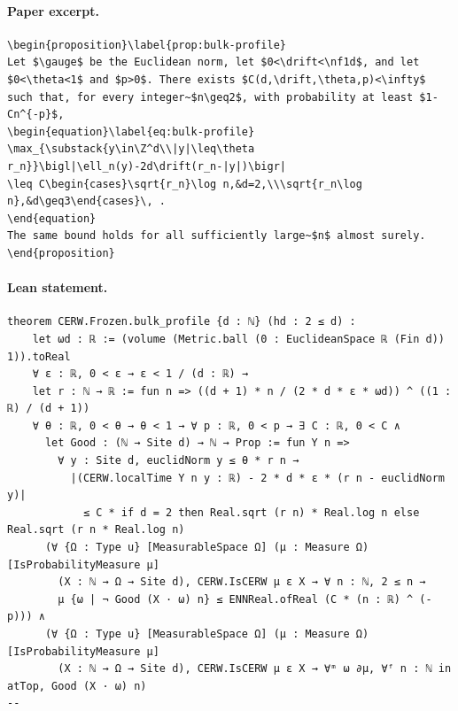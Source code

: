 \paragraph{Paper excerpt.}
\begin{verbatim}
\begin{proposition}\label{prop:bulk-profile}
Let $\gauge$ be the Euclidean norm, let $0<\drift<\nf1d$, and let $0<\theta<1$ and $p>0$. There exists $C(d,\drift,\theta,p)<\infty$ such that, for every integer~$n\geq2$, with probability at least $1-Cn^{-p}$,
\begin{equation}\label{eq:bulk-profile}
\max_{\substack{y\in\Z^d\\|y|\leq\theta r_n}}\bigl|\ell_n(y)-2d\drift(r_n-|y|)\bigr|
\leq C\begin{cases}\sqrt{r_n}\log n,&d=2,\\\sqrt{r_n\log n},&d\geq3\end{cases}\, .
\end{equation}
The same bound holds for all sufficiently large~$n$ almost surely.
\end{proposition}
\end{verbatim}
\paragraph{Lean statement.}
\begin{verbatim}
theorem CERW.Frozen.bulk_profile {d : ℕ} (hd : 2 ≤ d) :
    let ωd : ℝ := (volume (Metric.ball (0 : EuclideanSpace ℝ (Fin d)) 1)).toReal
    ∀ ε : ℝ, 0 < ε → ε < 1 / (d : ℝ) →
    let r : ℕ → ℝ := fun n => ((d + 1) * n / (2 * d * ε * ωd)) ^ ((1 : ℝ) / (d + 1))
    ∀ θ : ℝ, 0 < θ → θ < 1 → ∀ p : ℝ, 0 < p → ∃ C : ℝ, 0 < C ∧
      let Good : (ℕ → Site d) → ℕ → Prop := fun Y n =>
        ∀ y : Site d, euclidNorm y ≤ θ * r n →
          |(CERW.localTime Y n y : ℝ) - 2 * d * ε * (r n - euclidNorm y)|
            ≤ C * if d = 2 then Real.sqrt (r n) * Real.log n else Real.sqrt (r n * Real.log n)
      (∀ {Ω : Type u} [MeasurableSpace Ω] (μ : Measure Ω) [IsProbabilityMeasure μ]
        (X : ℕ → Ω → Site d), CERW.IsCERW μ ε X → ∀ n : ℕ, 2 ≤ n →
        μ {ω | ¬ Good (X · ω) n} ≤ ENNReal.ofReal (C * (n : ℝ) ^ (-p))) ∧
      (∀ {Ω : Type u} [MeasurableSpace Ω] (μ : Measure Ω) [IsProbabilityMeasure μ]
        (X : ℕ → Ω → Site d), CERW.IsCERW μ ε X → ∀ᵐ ω ∂μ, ∀ᶠ n : ℕ in atTop, Good (X · ω) n)
--
\end{verbatim}
